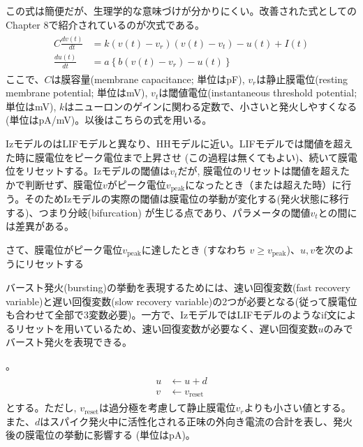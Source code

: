 \documentclass[letterpaper,10pt,english]{sphinxmanual}
\begin{document}
この式は簡便だが、生理学的な意味づけが分かりにくい。改善された式としてのChapter 8で紹介されているのが次式である。
\begin{equation*}
\begin{split}
\begin{align}
C\frac{dv(t)}{dt}&=k\left(v(t)-v_r\right)\left(v(t)-v_t\right)-u(t)+I(t) \\
\frac{du(t)}{dt}&=a\left\{b\left(v(t)-v_{r}\right)-u(t)\right\}
\end{align} 
\end{split}
\end{equation*}
ここで、\(C\)は膜容量(membrane capacitance; 単位はpF), \(v_r\)は静止膜電位(resting membrane potential; 単位はmV), \(v_t\)は閾値電位(instantaneous threshold potential; 単位はmV), \(k\)はニューロンのゲインに関わる定数で、小さいと発火しやすくなる (単位はpA/mV)。以後はこちらの式を用いる。

IzモデルのはLIFモデルと異なり、HHモデルに近い。LIFモデルでは閾値を超えた時に膜電位をピーク電位まで上昇させ (この過程は無くてもよい)、続いて膜電位をリセットする。Izモデルの閾値は\(v_t\)だが, 膜電位のリセットは閾値を超えたかで判断せず、膜電位\(v\)がピーク電位\(v_{\text{peak}}\)になったとき（または超えた時）に行う。そのためIzモデルの実際の閾値は膜電位の挙動が変化する(発火状態に移行する)、つまり分岐(bifurcation) が生じる点であり、パラメータの閾値\(v_t\)との間には差異がある。

さて、膜電位がピーク電位\(v_{\text{peak}}\)に達したとき (すなわち  \(v \geq v_{\text{peak}}\))、\(u, v\)を次のようにリセットする%
\begin{footnote}[4]\sphinxAtStartFootnote
バースト発火(bursting)の挙動を表現するためには、速い回復変数(fast recovery variable)と遅い回復変数(slow recovery variable)の2つが必要となる(従って膜電位も合わせて全部で3変数必要)。一方で、IzモデルではLIFモデルのようなif文によるリセットを用いているため、速い回復変数が必要なく、遅い回復変数\(u\)のみでバースト発火を表現できる。
%
\end{footnote}。
\begin{equation*}
\begin{split}
\begin{align} 
u&\leftarrow u+d\\
v&\leftarrow v_{\text{reset}}
\end{align}
\end{split}
\end{equation*}
とする。ただし, \(v_{\text{reset}}\)は過分極を考慮して静止膜電位\(v_r\)よりも小さい値とする。また、\(d\)はスパイク発火中に活性化される正味の外向き電流の合計を表し、発火後の膜電位の挙動に影響する (単位はpA)。
\end{document}
